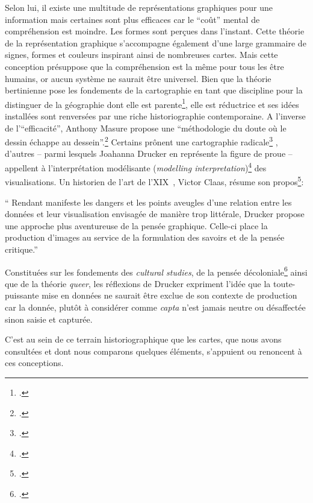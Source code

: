 Selon lui, il existe une multitude de représentations graphiques pour une information mais certaines sont plus efficaces car le \enquote{coût} mental de compréhension est moindre. Les formes sont perçues dans l'instant. Cette théorie de la représentation graphique s'accompagne également d'une large grammaire de signes, formes et couleurs inspirant ainsi de nombreuses cartes. Mais cette conception présuppose que la compréhension est la même pour tous les être humains, or aucun système ne saurait être universel. Bien que la théorie bertinienne pose les fondements de la cartographie en tant que discipline pour la distinguer de la géographie dont elle est parente\footcite{CFCHistoire2024}, elle est réductrice et ses idées installées sont renversées par une riche historiographie contemporaine. A l'inverse de l'\enquote{efficacité}, Anthony Masure propose une \enquote{méthodologie du doute où le dessin échappe au dessein}.\footcite{MASUREDesign2017} Certains prônent une cartographie radicale\footcite{ZWERCartographie2022} , d'autres -- parmi lesquels Joahanna Drucker en représente la figure de proue  -- appellent à l'interprétation modélisante (\textit{modelling interpretation})\footcite{DRUCKERVisualisation2020} des visualisations. Un historien de l'art de l'XIX\ieme~,  Victor Claas, résume son propos\footcite{CLAASJohanna2021}:
\begin{displayquote}
\enquote{ Rendant manifeste les dangers et les points aveugles d’une relation entre les données et leur visualisation envisagée de manière trop littérale, Drucker propose une approche plus aventureuse de la pensée graphique. Celle-ci place la production d’images au service de la formulation des savoirs et de la pensée critique.}
\end{displayquote}
Constituées sur les fondements des \textit{cultural studies}, de la pensée décoloniale\footcite{HANCOCKDecoloniser2008} ainsi que de la théorie \textit{queer}, les réflexions de Drucker expriment l'idée que la toute-puissante mise en données ne saurait être exclue de son contexte de production car la donnée, plutôt à considérer comme \textit{capta} n'est jamais neutre ou désaffectée sinon saisie et capturée. 

C'est au sein de ce terrain historiographique que les cartes, que nous avons consultées et dont nous comparons quelques éléments, s'appuient ou renoncent à ces conceptions. 

